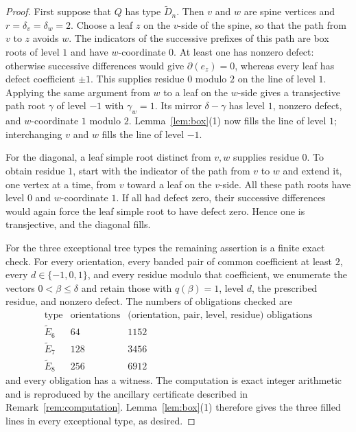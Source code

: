 \documentclass[11pt, a4paper]{amsart}
\theoremstyle{definition}
\begin{document}
\begin{proof}
First suppose that $Q$ has type $\widetilde D_n$. Then $v$ and $w$ are
spine vertices and $r=\delta_v=\delta_w=2$. Choose a leaf $z$ on the
$v$-side of the spine, so that the path from $v$ to $z$ avoids $w$. The
indicators of the successive prefixes of this path are box roots of level
$1$ and have $w$-coordinate $0$. At least one has nonzero defect: otherwise
successive differences would give $\partial(e_z)=0$, whereas every leaf has
defect coefficient $\pm1$. This supplies residue $0$ modulo $2$ on the line
of level $1$. Applying the same argument from $w$ to a leaf on the
$w$-side gives a transjective path root $\gamma$ of level $-1$ with
$\gamma_w=1$. Its mirror $\delta-\gamma$ has level $1$, nonzero defect, and
$w$-coordinate $1$ modulo $2$. Lemma~\ref{lem:box}(1) now fills the line of
level $1$; interchanging $v$ and $w$ fills the line of level $-1$.

For the diagonal, a leaf simple root distinct from $v,w$ supplies residue
$0$. To obtain residue $1$, start with the indicator of the path from $v$
to $w$ and extend it, one vertex at a time, from $v$ toward a leaf on the
$v$-side. All these path roots have level $0$ and $w$-coordinate $1$. If
all had defect zero, their successive differences would again force the
leaf simple root to have defect zero. Hence one is transjective, and the
diagonal fills.

For the three exceptional tree types the remaining assertion is a finite
exact check. For every orientation, every banded pair of common coefficient
at least $2$, every $d\in\{-1,0,1\}$, and every residue modulo that
coefficient, we enumerate the vectors $0<\beta\leq\delta$ and retain those
with $q(\beta)=1$, level $d$, the prescribed residue, and nonzero defect.
The numbers of obligations checked are
\[
\begin{array}{c|c|c}
\text{type} & \text{orientations} &
\text{(orientation, pair, level, residue) obligations}\\ \hline
\widetilde E_6 & 64 & 1152\\
\widetilde E_7 & 128 & 3456\\
\widetilde E_8 & 256 & 6912
\end{array}
\]
and every obligation has a witness. The computation is exact integer
arithmetic and is reproduced by the ancillary certificate described in
Remark~\ref{rem:computation}. Lemma~\ref{lem:box}(1) therefore gives the
three filled lines in every exceptional type, as desired.
\end{proof}
\end{document}
